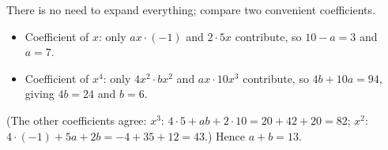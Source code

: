 There is no need to expand everything; compare two convenient coefficients.
\begin{itemize}
\item Coefficient of $x$: only $ax\cdot(-1)$ and $2\cdot5x$ contribute, so $10-a=3$ and $a=7$.
\item Coefficient of $x^4$: only $4x^2\cdot bx^2$ and $ax\cdot10x^3$ contribute, so $4b+10a=94$, giving $4b=24$ and $b=6$.
\end{itemize}
(The other coefficients agree: $x^3$: $4\cdot5+ab+2\cdot10=20+42+20=82$; $x^2$: $4\cdot(-1)+5a+2b=-4+35+12=43$.) Hence $a+b=\boxed{13}$.
